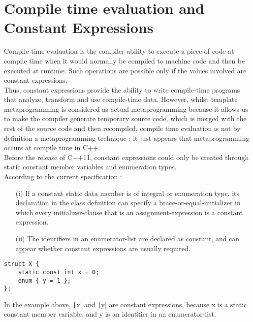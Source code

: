 \section*{Compile time evaluation and Constant Expressions}

Compile time evaluation is the compiler ability to execute a piece of code at compile time when it would normally be compiled to machine code and then be executed at runtime. Such operations are possible only if the values involved are constant expressions.  \\

Thus, constant expressions provide the ability to write compile-time programs that analyze, transform and use compile-time data. However, whilst template metaprogramming is considered as actual metaprogramming because it allows us to make the compiler generate temporary source code, which is merged with the rest of the source code and then recompiled, compile time evaluation is not by definition a metaprogramming technique ; it just appears that metaprogramming occurs at compile time in C++. \\

Before the release of C++11, constant expressions could only be created through static constant member variables and enumeration types. \\

According to the current specification :
\begin{itemize}
    \item[(i)] If a constant static data member is of integral or enumeration type, its declaration in the class definition can specify a brace-or-equal-initializer in which every initializer-clause that is an assignment-expression is a constant expression.

    \vspace{10pt}

    \item[(ii)] The identifiers in an enumerator-list are declared as constant, and can appear whether constant expressions are usually required.
\end{itemize}

\newpage

\begin{paracol}{2}
\begin{verbatim}
struct X {
    static const int x = 0;
    enum { y = 1 };
};
\end{verbatim}

\switchcolumn

In the example above, \texttt|x| and \texttt|y| are constant expressions, because x is a static constant member variable, and y is an identifier in an enumerator-list. 
\end{paracol}


